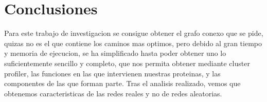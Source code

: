 \section{Conclusiones}
Para este trabajo de investigacion se consigue obtener el grafo conexo que se pide, quizas no es el que contiene los caminos mas optimos, pero debido al gran tiempo y memoria de ejecucion, se ha simplificado hasta poder obtener uno lo suficientemente sencillo y completo, que nos permita obtener mediante cluster profiler, las funciones en las que intervienen nuestras proteinas, y las componentes de las que forman parte. Tras el analisis realizado, vemos que obtenemos caracteristicas de las redes reales y no de redes aleatorias. 

